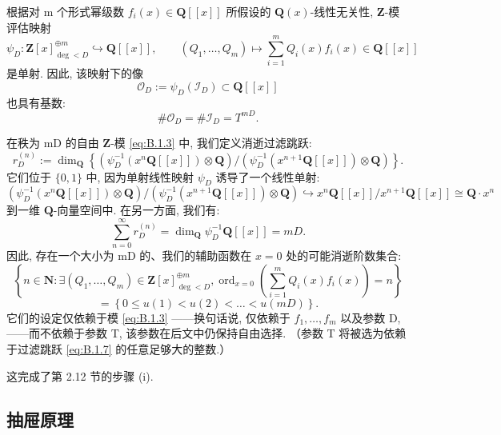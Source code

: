 根据对 m 个形式幂级数 \(f_i(x) \in \mathbf{Q}[\![x]\!]\) 
所假设的 \(\mathbf{Q}(x)\)-线性无关性, 
\(\mathbf{Z}\)-模评估映射
\begin{equation}\label{eq:B.1.3}
\psi_D: \mathbf{Z}[x]_{\deg < D}^{\oplus m} \hookrightarrow \mathbf{Q}[\![x]\!], \qquad (Q_1, \dots, Q_m) \mapsto \sum_{i=1}^m Q_i(x) f_i(x) \in \mathbf{Q}[\![x]\!]
\end{equation}
是单射. 
因此, 该映射下的像
\[ \mathcal{O}_D := \psi_D(\mathcal{I}_D) \subset \mathbf{Q}[\![x]\!] \]
也具有基数:
\begin{equation}\label{eq:B.1.4}
\#\mathcal{O}_D = \#\mathcal{I}_D = T^{mD}.
\end{equation}

在秩为 mD 的自由 \(\mathbf{Z}\)-模 \eqref{eq:B.1.3} 中, 我们定义消逝过滤跳跃:
\begin{equation}\label{eq:B.1.5}
r_D^{(n)} := \dim_{\mathbf{Q}} \left\{ \left( \psi_D^{-1} \left( x^n \mathbf{Q} [\![x]\!] \right) \otimes \mathbf{Q} \right) / \left( \psi_D^{-1} \left( x^{n+1} \mathbf{Q} [\![x]\!] \right) \otimes \mathbf{Q} \right) \right\}.
\end{equation}
它们位于 \(\{0,1\}\) 中, 因为单射线性映射 \(\psi_D\) 诱导了一个线性单射:
\[ \left(\psi_D^{-1}\left(x^n\mathbf{Q}[\![x]\!]\right)\otimes\mathbf{Q}\right)/\left(\psi_D^{-1}\left(x^{n+1}\mathbf{Q}[\![x]\!]\right)\otimes\mathbf{Q}\right)\hookrightarrow x^n\mathbf{Q}[\![x]\!]/x^{n+1}\mathbf{Q}[\![x]\!]\cong\mathbf{Q}\cdot x^n \]
到一维 \(\mathbf{Q}\)-向量空间中. 
在另一方面, 我们有:
\begin{equation}\label{eq:B.1.6}
\sum_{n=0}^{\infty} r_D^{(n)} = \dim_{\mathbf{Q}} \psi_D^{-1} \mathbf{Q} [\![x]\!] = mD.
\end{equation}
因此, 存在一个大小为 mD 的、我们的辅助函数在 \(x = 0\) 处的可能消逝阶数集合:
\begin{equation}\label{eq:B.1.7}
\left\{ n \in \mathbf{N} : \exists (Q_1, \dots, Q_m) \in \mathbf{Z}[x]_{\deg < D}^{\oplus m}, \operatorname{ord}_{x=0} \left( \sum_{i=1}^m Q_i(x) f_i(x) \right) = n \right\}
\end{equation}
\[ = \left\{ 0 \le u(1) < u(2) < \dots < u(mD) \right\}. \]
它们的设定仅依赖于模 \eqref{eq:B.1.3} 
——换句话说, 仅依赖于 \(f_1, \ldots, f_m\) 以及参数 D, 
——而不依赖于参数 T, 该参数在后文中仍保持自由选择. 
（参数 T 将被选为依赖于过滤跳跃 \eqref{eq:B.1.7} 的任意足够大的整数.）

这完成了第 2.12 节的步骤 (i).

\subsection{抽屉原理}\label{sec:B.2}

